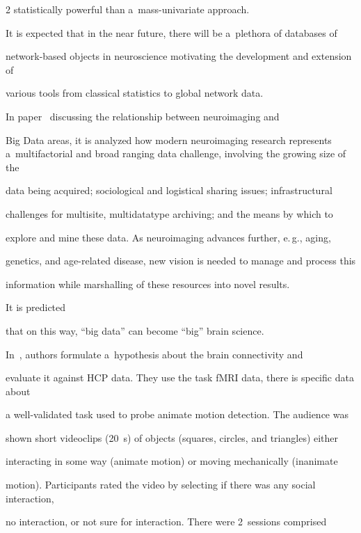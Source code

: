 \begin{multicols}{2}
statistically powerful than a~mass-univariate approach.





  It is expected that in the near future, there will be a~plethora of databases of


network-based objects in neuroscience motivating the development and extension of


various tools from classical statistics to global network data.








  In paper~\cite{71-kl} discussing the relationship between neuroimaging and


Big Data areas, it is analyzed how modern neuroimaging research represents a~multifactorial and broad ranging data challenge, involving the growing size of the


data being acquired; sociological and logistical sharing issues; infrastructural


challenges for multisite, multidatatype archiving; and the means by which to


explore and mine these data. As neuroimaging advances further, e.\,g., aging,


genetics, and age-related disease, new vision is needed to manage and process this


information while marshalling of these resources into novel results.


It is predicted


that on this way, ``big data'' can become ``big'' brain science.





  In~\cite{72-kl}, authors formulate a~hypothesis about the brain connectivity and


evaluate it against HCP data. They use the task fMRI data, there is specific data about


a well-validated task used to probe animate motion detection. The audience was


shown short videoclips (20~s) of objects (squares, circles, and triangles) either


interacting in some way (animate motion) or moving mechanically (inanimate


motion). Participants rated the video by selecting if there was any social interaction,


no interaction, or not sure for interaction. There were 2~sessions comprised



\end{multicols}
